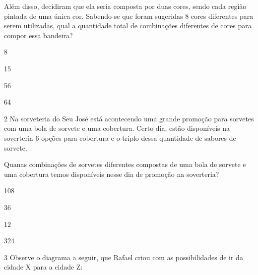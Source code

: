 Além disso, decidiram que ela seria composta por duas cores, sendo cada
região pintada de uma única cor. Sabendo-se que foram sugeridas 8 cores
diferentes para serem utilizadas, qual a quantidade total de combinações
diferentes de cores para compor essa bandeira?

\begin{minipage}{.5\textwidth}
\begin{escolha}
\item
  8
\item
  15
\item
  56
\item
  64
\end{escolha}
\end{minipage}


\num{2} Na sorveteria do Seu José está acontecendo uma grande promoção
para sorvetes com uma bola de sorvete e uma cobertura. Certo dia, estão disponíveis na soverteria 6 opções para cobertura e o triplo dessa quantidade de sabores de sorvete.

Quanas combinações de sorvetes diferentes compostas de uma bola de
sorvete e uma cobertura temos disponíveis nesse dia de promoção na soverteria?

\begin{minipage}{.5\textwidth}
\begin{escolha}
\item
  108
\item
  36
\item
  12
\item
  324
\end{escolha}
\end{minipage}

\pagebreak
\num{3} Observe o diagrama a seguir, que Rafael criou com as possibilidades de ir da cidade X para a cidade Z:

